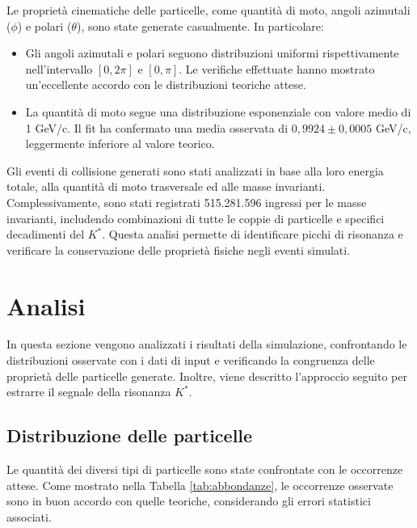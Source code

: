\documentclass[a4paper,11pt]{article}
\begin{document}
Le proprietà cinematiche delle particelle, come quantità di moto, angoli azimutali (\( \phi \)) e polari (\( \theta \)), sono state generate casualmente. In particolare:

\begin{itemize}
    \item Gli angoli azimutali e polari seguono distribuzioni uniformi rispettivamente nell'intervallo \([0, 2\pi]\) e \([0, \pi]\). Le verifiche effettuate hanno mostrato un'eccellente accordo con le distribuzioni teoriche attese.
    \item La quantità di moto segue una distribuzione esponenziale con valore medio di 1 GeV/c. Il fit ha confermato una media osservata di \(0,9924 \pm 0,0005\) GeV/c, leggermente inferiore al valore teorico.
\end{itemize}

Gli eventi di collisione generati sono stati analizzati in base alla loro energia totale, alla quantità di moto trasversale ed alle masse invarianti. Complessivamente, sono stati registrati 515.281.596 ingressi per le masse invarianti, includendo combinazioni di tutte le coppie di particelle e specifici decadimenti del \( K^* \). Questa analisi permette di identificare picchi di risonanza e verificare la conservazione delle proprietà fisiche negli eventi simulati.

\clearpage

\section{Analisi}

In questa sezione vengono analizzati i risultati della simulazione, confrontando le distribuzioni osservate con i dati di input e verificando la congruenza delle proprietà delle particelle generate. Inoltre, viene descritto l'approccio seguito per estrarre il segnale della risonanza \( K^* \).

\subsection{Distribuzione delle particelle}

Le quantità dei diversi tipi di particelle sono state confrontate con le occorrenze attese. Come mostrato nella Tabella \ref{tab:abbondanze}, le occorrenze osservate sono in buon accordo con quelle teoriche, considerando gli errori statistici associati.
\end{document}
